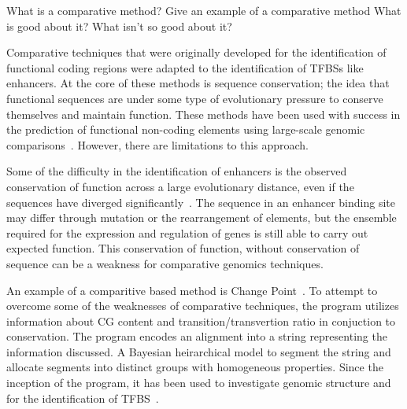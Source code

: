 


        What is a comparative method?
        Give an example of a comparative method
        What is good about it?
        What isn't so good about it?


        Comparative techniques that were originally developed for the identification of functional coding regions were adapted to the identification of TFBSs like enhancers. At the core of these methods is sequence conservation; the idea that functional sequences are under some type of evolutionary pressure to conserve themselves and maintain function. These methods have been used with success in the prediction of functional non-coding elements using large-scale genomic comparisons~\cite{aparicio2002whole, gottgens2000analysis, loots 2000identification, mouse2002initial}. However, there are limitations to this approach.

        Some of the difficulty in the identification of enhancers is the observed conservation of function across a large evolutionary distance, even if the sequences have diverged significantly~\cite{tautz2000evolution}. The sequence in an enhancer binding site may differ through mutation or the rearrangement of elements, but the ensemble required for the expression and regulation of genes is still able to carry out expected function. This conservation of function, without conservation of sequence can be a weakness for comparative genomics techniques. 

        An example of a comparitive based method is Change Point~\cite{keith2006segmenting}. To attempt to overcome some of the weaknesses of comparative techniques, the program utilizes information about CG content and transition/transvertion ratio in conjuction to conservation. The program encodes an alignment into a string representing the information discussed. A Bayesian heirarchical model to segment the string and allocate segments into distinct groups with homogeneous properties. Since the inception of the program, it has been used to investigate genomic structure and for the identification of TFBS~\cite{alagma2014investigating, algama2017genome}. 

